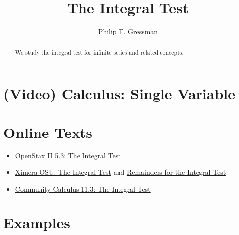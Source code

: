 \documentclass{ximera}
\title{The Integral Test}
\author{Philip T. Gressman}
\begin{document}
\begin{abstract}
  We study the integral test for infinite series and related concepts.
\end{abstract}
\maketitle

\section*{(Video) Calculus: Single Variable}

\section*{Online Texts}
\begin{itemize}
\item \href{https://openstax.org/books/calculus-volume-2/pages/5-3-the-divergence-and-integral-tests}{OpenStax II 5.3: The Integral Test}
\item \href{https://ximera.osu.edu/mooculus/calculus2/integralTest/titlePage}{Ximera OSU: The Integral Test} and \href{https://ximera.osu.edu/mooculus/calculus2/remainders/digInRemaindersIntegralTest}{Remainders for the Integral Test}
\item \href{https://www.whitman.edu/mathematics/calculus_online/section11.03.html}{Community Calculus 11.3: The Integral Test}
\end{itemize}

\section*{Examples}

\begin{example}

\end{example}

\begin{example}

\end{example}
\end{document}
